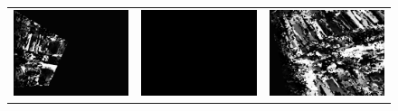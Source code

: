 \documentclass[11pt]{report}
\begin{document}
\begin{figure}[H]
\begin{tabular}{ccc}
    \includegraphics[scale=0.1]{images/disparity-opencv-t/disparity_13.png} &
    \includegraphics[scale=0.1]{images/disparity-opencv-d/disparity_13.png} &
    \includegraphics[scale=0.1]{images/disparity-opengv/disparity_13.png} \\

\end{tabular}
\end{figure}
\end{document}
